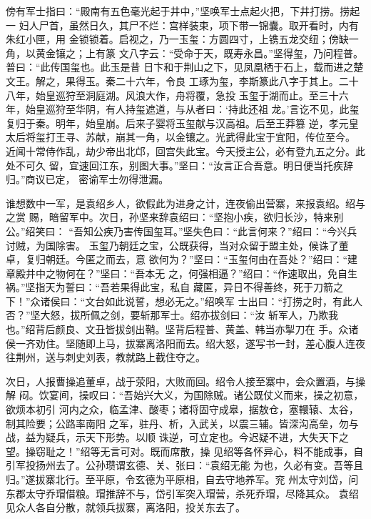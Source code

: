 傍有军士指曰：“殿南有五色毫光起于井中，”坚唤军士点起火把，下井打捞。捞起一
妇人尸首，虽然日久，其尸不烂：宫样装束，项下带一锦囊。取开看时，内有朱红小匣，用
金锁锁着。启视之，乃一玉玺：方圆四寸，上镌五龙交纽；傍缺一角，以黄金镶之；上有篆
文八字云：“受命于天，既寿永昌。”坚得玺，乃问程普。普曰：“此传国玺也。此玉是昔
日卞和于荆山之下，见凤凰栖于石上，载而进之楚文王。解之，果得玉。秦二十六年，令良
工琢为玺，李斯篆此八字于其上。二十八年，始皇巡狩至洞庭湖。风浪大作，舟将覆，急投
玉玺于湖而止。至三十六年，始皇巡狩至华阴，有人持玺遮道，与从者曰：‘持此还祖
龙。’言讫不见，此玺复归于秦。明年，始皇崩。后来子婴将玉玺献与汉高祖。后至王莽篡
逆，孝元皇太后将玺打王寻、苏献，崩其一角，以金镶之。光武得此宝于宜阳，传位至今。
近闻十常侍作乱，劫少帝出北邙，回宫失此宝。今天授主公，必有登九五之分。此处不可久
留，宜速回江东，别图大事。”坚曰：“汝言正合吾意。明日便当托疾辞归。”商议已定，
密谕军士勿得泄漏。

谁想数中一军，是袁绍乡人，欲假此为进身之计，连夜偷出营寨，来报袁绍。绍与之赏
赐，暗留军中。次日，孙坚来辞袁绍曰：“坚抱小疾，欲归长沙，特来别公。”绍笑曰：
“吾知公疾乃害传国玺耳。”坚失色曰：“此言何来？”绍曰：“今兴兵讨贼，为国除害。
玉玺乃朝廷之宝，公既获得，当对众留于盟主处，候诛了董卓，复归朝廷。今匿之而去，意
欲何为？”坚曰：“玉玺何由在吾处？”绍曰：“建章殿井中之物何在？”坚曰：“吾本无
之，何强相逼？”绍曰：“作速取出，免自生祸。”坚指天为誓曰：“吾若果得此宝，私自
藏匿，异日不得善终，死于刀箭之下！”众诸侯曰：“文台如此说誓，想必无之。”绍唤军
士出曰：“打捞之时，有此人否？”坚大怒，拔所佩之剑，要斩那军士。绍亦拔剑曰：“汝
斩军人，乃欺我也。”绍背后颜良、文丑皆拔剑出鞘。坚背后程普、黄盖、韩当亦掣刀在
手。众诸侯一齐劝住。坚随即上马，拔寨离洛阳而去。绍大怒，遂写书一封，差心腹人连夜
往荆州，送与刺史刘表，教就路上截住夺之。

次日，人报曹操追董卓，战于荥阳，大败而回。绍令人接至寨中，会众置酒，与操解
闷。饮宴间，操叹曰：“吾始兴大义，为国除贼。诸公既仗义而来，操之初意，欲烦本初引
河内之众，临孟津、酸枣；诸将固守成皋，据敖仓，塞轘辕、太谷，制其险要；公路率南阳
之军，驻丹、析，入武关，以震三辅。皆深沟高垒，勿与战，益为疑兵，示天下形势。以顺
诛逆，可立定也。今迟疑不进，大失天下之望。操窃耻之！”绍等无言可对。既而席散，操
见绍等各怀异心，料不能成事，自引军投扬州去了。公孙瓒谓玄德、关、张曰：“袁绍无能
为也，久必有变。吾等且归。”遂拔寨北行。至平原，令玄德为平原相，自去守地养军。兖
州太守刘岱，问东郡太守乔瑁借粮。瑁推辞不与，岱引军突入瑁营，杀死乔瑁，尽降其众。
袁绍见众人各自分散，就领兵拔寨，离洛阳，投关东去了。

